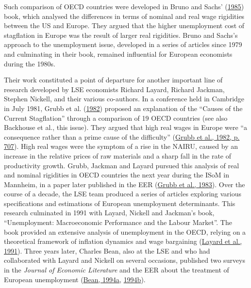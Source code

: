 \documentclass[
  12pt,
  onecolumn]{article}
\begin{document}
Such comparison of OECD countries were developed in Bruno and Sachs'
(\protect\hyperlink{ref-brunosachs1985}{1985}) book, which analysed the
differences in terms of nominal and real wage rigidities between the US
and Europe. They argued that the higher unemployment cost of stagflation
in Europe was the result of larger real rigidities. Bruno and Sachs's
approach to the unemployment issue, developed in a series of articles
since 1979 and culminating in their book, remained influential for
European economists during the 1980s.

Their work constituted a point of departure for another important line
of research developed by LSE economists Richard Layard, Richard Jackman,
Stephen Nickell, and their various co-authors. In a conference held in
Cambridge in July 1981, Grubb et al.
(\protect\hyperlink{ref-grubb1982}{1982}) proposed an explanation of the
``Causes of the Current Stagflation'' through a comparison of 19 OECD
countries (see also Backhouse et al., this issue). They argued that high
real wages in Europe were ``a consequence rather than a prime cause of
the difficulty'' (\protect\hyperlink{ref-grubb1982}{Grubb et al., 1982,
p. 707}). High real wages were the symptom of a rise in the NAIRU,
caused by an increase in the relative prices of raw materials and a
sharp fall in the rate of productivity growth. Grubb, Jackman and Layard
pursued this analysis of real and nominal rigidities in OECD countries
the next year during the ISoM in Mannheim, in a paper later published in
the EER (\protect\hyperlink{ref-grubb1983a}{Grubb et al., 1983}). Over
the course of a decade, the LSE team produced a series of articles
exploring various specifications and estimations of European
unemployment determinants. This research culminated in 1991 with Layard,
Nickell and Jackman's book, ``Unemployment: Macroeconomic Performance
and the Labour Market''. The book provided an extensive analysis of
unemployment in the OECD, relying on a theoretical framework of
inflation dynamics and wage bargaining
(\protect\hyperlink{ref-layard1991a}{Layard et al., 1991}). Three years
later, Charles Bean, also at the LSE and who had collaborated with
Layard and Nickell on several occasions, published two surveys in the
\emph{Journal of Economic Literature} and the EER about the treatment of
European unemployment (\protect\hyperlink{ref-bean1994}{Bean, 1994a},
\protect\hyperlink{ref-bean1994a}{1994b}).
\end{document}
